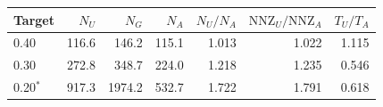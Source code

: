 \begin{tabular}{@{}lrrrrrr@{}}
\toprule
Target & $N_U$ & $N_G$ & $N_A$ & $N_U/N_A$ & $\mathrm{NNZ}_U/\mathrm{NNZ}_A$ & $T_U/T_A$\\
\midrule
0.40 & 116.6 & 146.2 & 115.1 & 1.013 & 1.022 & 1.115\\
0.30 & 272.8 & 348.7 & 224.0 & 1.218 & 1.235 & 0.546\\
0.20$^*$ & 917.3 & 1974.2 & 532.7 & 1.722 & 1.791 & 0.618\\
\bottomrule
\end{tabular}
